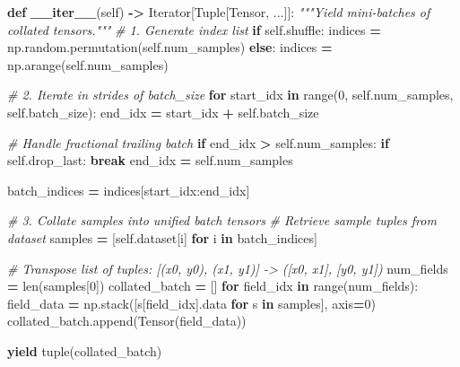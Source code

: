 \documentclass[
  letterpaper,
]{scrbook}
\newenvironment{Shaded}{\begin{snugshade}}{\end{snugshade}}
\newcommand{\BuiltInTok}[1]{#1}
\newcommand{\CommentTok}[1]{\textcolor[rgb]{0.56,0.35,0.01}{\textit{#1}}}
\newcommand{\ControlFlowTok}[1]{\textcolor[rgb]{0.13,0.29,0.53}{\textbf{#1}}}
\newcommand{\DecValTok}[1]{\textcolor[rgb]{0.00,0.00,0.81}{#1}}
\newcommand{\FunctionTok}[1]{\textcolor[rgb]{0.13,0.29,0.53}{\textbf{#1}}}
\newcommand{\KeywordTok}[1]{\textcolor[rgb]{0.13,0.29,0.53}{\textbf{#1}}}
\newcommand{\NormalTok}[1]{#1}
\newcommand{\OperatorTok}[1]{\textcolor[rgb]{0.81,0.36,0.00}{\textbf{#1}}}
\newcommand{\VariableTok}[1]{\textcolor[rgb]{0.00,0.00,0.00}{#1}}
\begin{document}
\begin{Shaded}
\begin{Highlighting}[]
    \KeywordTok{def} \FunctionTok{\_\_iter\_\_}\NormalTok{(}\VariableTok{self}\NormalTok{) }\OperatorTok{{-}\textgreater{}}\NormalTok{ Iterator[Tuple[Tensor, ...]]:}
        \CommentTok{"""Yield mini{-}batches of collated tensors."""}
        \CommentTok{\# 1. Generate index list}
        \ControlFlowTok{if} \VariableTok{self}\NormalTok{.shuffle:}
\NormalTok{            indices }\OperatorTok{=}\NormalTok{ np.random.permutation(}\VariableTok{self}\NormalTok{.num\_samples)}
        \ControlFlowTok{else}\NormalTok{:}
\NormalTok{            indices }\OperatorTok{=}\NormalTok{ np.arange(}\VariableTok{self}\NormalTok{.num\_samples)}

        \CommentTok{\# 2. Iterate in strides of batch\_size}
        \ControlFlowTok{for}\NormalTok{ start\_idx }\KeywordTok{in} \BuiltInTok{range}\NormalTok{(}\DecValTok{0}\NormalTok{, }\VariableTok{self}\NormalTok{.num\_samples, }\VariableTok{self}\NormalTok{.batch\_size):}
\NormalTok{            end\_idx }\OperatorTok{=}\NormalTok{ start\_idx }\OperatorTok{+} \VariableTok{self}\NormalTok{.batch\_size}

            \CommentTok{\# Handle fractional trailing batch}
            \ControlFlowTok{if}\NormalTok{ end\_idx }\OperatorTok{\textgreater{}} \VariableTok{self}\NormalTok{.num\_samples:}
                \ControlFlowTok{if} \VariableTok{self}\NormalTok{.drop\_last:}
                    \ControlFlowTok{break}
\NormalTok{                end\_idx }\OperatorTok{=} \VariableTok{self}\NormalTok{.num\_samples}

\NormalTok{            batch\_indices }\OperatorTok{=}\NormalTok{ indices[start\_idx:end\_idx]}

            \CommentTok{\# 3. Collate samples into unified batch tensors}
            \CommentTok{\# Retrieve sample tuples from dataset}
\NormalTok{            samples }\OperatorTok{=}\NormalTok{ [}\VariableTok{self}\NormalTok{.dataset[i] }\ControlFlowTok{for}\NormalTok{ i }\KeywordTok{in}\NormalTok{ batch\_indices]}

            \CommentTok{\# Transpose list of tuples: [(x0, y0), (x1, y1)] {-}\textgreater{} ([x0, x1], [y0, y1])}
\NormalTok{            num\_fields }\OperatorTok{=} \BuiltInTok{len}\NormalTok{(samples[}\DecValTok{0}\NormalTok{])}
\NormalTok{            collated\_batch }\OperatorTok{=}\NormalTok{ []}
            \ControlFlowTok{for}\NormalTok{ field\_idx }\KeywordTok{in} \BuiltInTok{range}\NormalTok{(num\_fields):}
\NormalTok{                field\_data }\OperatorTok{=}\NormalTok{ np.stack([s[field\_idx].data }\ControlFlowTok{for}\NormalTok{ s }\KeywordTok{in}\NormalTok{ samples], axis}\OperatorTok{=}\DecValTok{0}\NormalTok{)}
\NormalTok{                collated\_batch.append(Tensor(field\_data))}

            \ControlFlowTok{yield} \BuiltInTok{tuple}\NormalTok{(collated\_batch)}
\end{Highlighting}
\end{Shaded}
\end{document}

